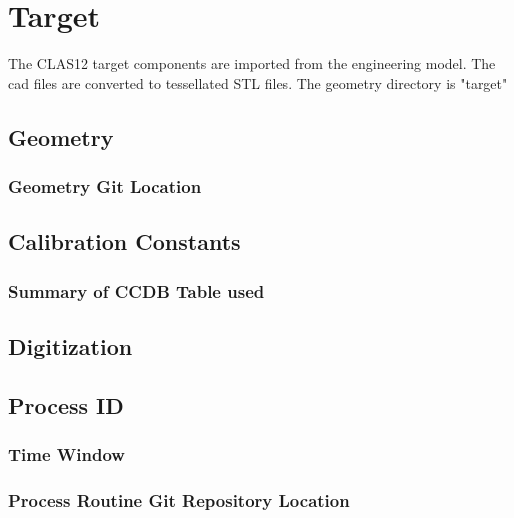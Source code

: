 \section{Target}

The CLAS12 target components are imported from the engineering model. The cad files are converted to tessellated STL files.
The geometry directory is "target"

\subsection{Geometry}

\subsubsection{Geometry Git Location}

\subsection{Calibration Constants}

\subsubsection{Summary of CCDB Table used}

\subsection{Digitization}

\subsection{Process ID}

\subsubsection{Time Window}

\subsubsection{Process Routine Git Repository Location}






